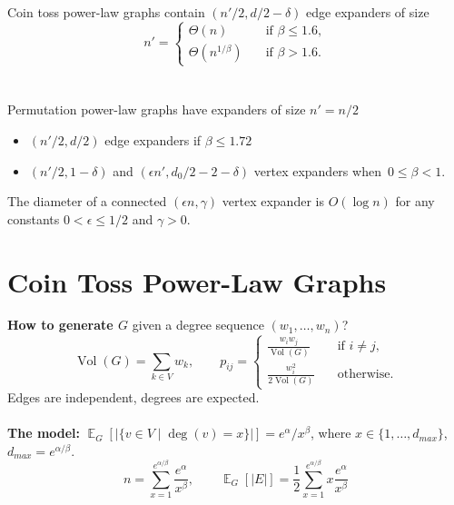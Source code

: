 \documentclass{beamer}
\newcommand{\E}{\mathop{{}\mathbb{E}}}
\DeclareMathOperator*{\Vol}{Vol}
\newcommand{\autotitle}{\secname\ifdefempty{\subsecname}{}{~--- \subsecname}}
\newcommand{\clearsubsecname}{\long\def\subsecname{}}
\newcommand{\smalldisplayskips}{
    \setlength{\abovedisplayskip}{3pt}
    \setlength{\belowdisplayskip}{3pt}}
\begin{document}
\begin{frame}{\autotitle}
    \smalldisplayskips
    Coin toss power-law graphs contain $(n'/2,d/2-\delta)$ edge expanders of size
    \begin{equation*}
        n'=
        \begin{cases}
            \Theta(n) & \quad \text{if } \beta\leq 1.6,\\
            \Theta\left(n^{1/\beta}\right) & \quad \text{if } \beta>1.6.
        \end{cases}
    \end{equation*}\\~\\
    
    Permutation power-law graphs have expanders of size $n'=n/2$
    \vspace{-8mm}
    \begin{itemize}
        \item $(n'/2,d/2)$ edge expanders if $\beta\leq 1.72$
        \item $(n'/2,1-\delta)$ and $(\epsilon n',d_0/2-2-\delta)$
        vertex expanders when~$0\leq\beta<1$.
    \end{itemize}

    The diameter of a connected $(\epsilon n,\gamma)$ vertex expander
    is $O(\log n)$ for any constants $0<\epsilon\leq1/2$ and $\gamma>0$.
\end{frame}

\section{Coin Toss Power-Law Graphs}
\clearsubsecname

\begin{frame}{\autotitle}
    \smalldisplayskips
    \textbf{How to generate $G$} given a degree sequence $(w_1,\ldots,w_n)$?
    \begin{equation*}
        \Vol(G)=\sum_{k\in V}{w_k},
        \qquad
        p_{ij}=
        \begin{cases}
            \frac{w_i w_j}{\Vol(G)} & \quad \text{if }i\neq j,\\
            \frac{w_i^2}{2\Vol(G)} & \quad \text{otherwise}.
        \end{cases}
    \end{equation*}
    Edges are independent, degrees are expected.\\~\\
    
    \textbf{The model:} $\E_G[|\{v \in V\;|\;\deg(v)=x\}|]=e^\alpha/x^\beta$,
    where $x\in\{1,\ldots,d_{max}\}$, $d_{max}=e^{\alpha/\beta}$.
    \begin{equation*}
        n=\sum_{x=1}^{e^{\alpha/\beta}}{\frac{e^\alpha}{x^\beta}},
        \qquad \E_G[|E|]=\frac{1}{2}\sum_{x=1}^{e^{\alpha/\beta}}{x\frac{e^\alpha}{x^\beta}}
    \end{equation*}
\end{frame}
\end{document}
